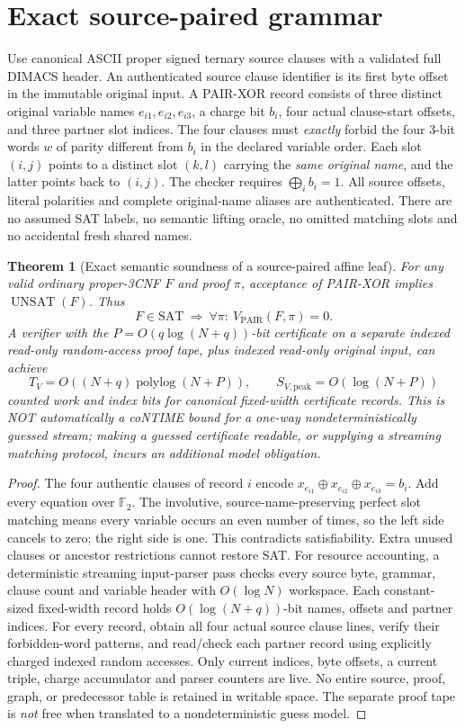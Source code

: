 \documentclass[11pt]{article}
\newtheorem{theorem}{Theorem}
\begin{document}
\section{Exact source-paired grammar}
Use canonical ASCII proper signed ternary source clauses with a validated full DIMACS header. An authenticated source clause identifier is its first byte offset in the immutable original input. A PAIR-XOR record consists of three distinct original variable names \(e_{i1},e_{i2},e_{i3}\), a charge bit \(b_i\), four actual clause-start offsets, and three partner slot indices. The four clauses must \emph{exactly} forbid the four 3-bit words \(w\) of parity different from \(b_i\) in the declared variable order. Each slot \((i,j)\) points to a distinct slot \((k,l)\) carrying the \emph{same original name}, and the latter points back to \((i,j)\). The checker requires \(\bigoplus_i b_i=1\). All source offsets, literal polarities and complete original-name aliases are authenticated. There are no assumed SAT labels, no semantic lifting oracle, no omitted matching slots and no accidental fresh shared names.

\begin{theorem}[Exact semantic soundness of a source-paired affine leaf]
For any valid ordinary proper-3CNF \(F\) and proof \(\pi\), acceptance of PAIR-XOR implies \(\operatorname{UNSAT}(F)\). Thus
\[
F\in\mathrm{SAT}\ \Longrightarrow\ \forall\pi:\ V_{\mathrm{PAIR}}(F,\pi)=0.
\]
A verifier with the \(P=O(q\log(N+q))\)-bit certificate on a separate \emph{indexed read-only random-access proof tape}, plus indexed read-only original input, can achieve
\[
T_V=O((N+q)\operatorname{polylog}(N+P)),\qquad
S_{V,\mathrm{peak}}=O(\log(N+P))
\]
counted work and index bits for canonical fixed-width certificate records. This is NOT automatically a coNTIME bound for a \emph{one-way nondeterministically guessed stream}; making a guessed certificate readable, or supplying a streaming matching protocol, incurs an additional model obligation.
\end{theorem}
\begin{proof}
The four authentic clauses of record \(i\) encode
\(x_{e_{i1}}\oplus x_{e_{i2}}\oplus x_{e_{i3}}=b_i\).
Add every equation over \(\mathbb F_2\). The involutive, source-name-preserving perfect slot matching means every variable occurs an even number of times, so the left side cancels to zero; the right side is one. This contradicts satisfiability. Extra unused clauses or ancestor restrictions cannot restore SAT.
For resource accounting, a deterministic streaming input-parser pass checks every source byte, grammar, clause count and variable header with \(O(\log N)\) workspace. Each constant-sized fixed-width record holds \(O(\log(N+q))\)-bit names, offsets and partner indices. For every record, obtain all four actual source clause lines, verify their forbidden-word patterns, and read/check each partner record using explicitly charged indexed random accesses. Only current indices, byte offsets, a current triple, charge accumulator and parser counters are live. No entire source, proof, graph, or predecessor table is retained in writable space. The separate proof tape is \emph{not} free when translated to a nondeterministic guess model.
\end{proof}
\end{document}
